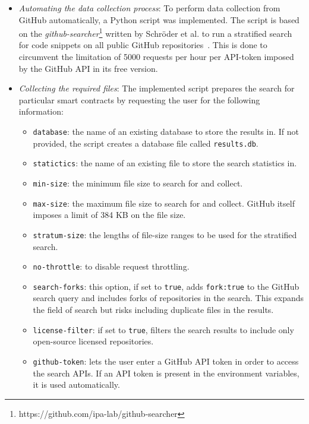 \documentclass[10pt,conference]{IEEEtran}
\begin{document}
\begin{itemize}
		\item \textit{Automating the data collection process}: To perform data collection from GitHub automatically, a Python script was implemented. The script is based on the \textit{github-searcher}\footnote{https://github.com/ipa-lab/github-searcher} written by Schröder et al. to run a stratified search for code snippets on all public GitHub repositories~\cite{schroder}. This is done to circumvent the limitation of 5000 requests per hour per API-token imposed by the GitHub API in its free version.
		\item \textit{Collecting the required files}: The implemented script prepares the search for particular smart contracts by requesting the user for the following information:
		\begin{itemize}
			\item \texttt{database}: the name of an existing database to store the results in. If not provided, the script creates a database file called \texttt{results.db}.
			\item \texttt{statictics}: the name of an existing file to store the search statistics in.
			\item \texttt{min-size}: the minimum file size to search for and collect.
			\item \texttt{max-size}: the maximum file size to search for and collect. GitHub itself imposes a limit of 384 KB on the file size.
			\item \texttt{stratum-size}: the lengths of file-size ranges to be used for the stratified search.
			\item \texttt{no-throttle}: to disable request throttling.
			\item \texttt{search-forks}: this option, if set to \texttt{true}, adds \texttt{fork:true} to the GitHub search query and includes forks of repositories in the search. This expands the field of search but risks including duplicate files in the results.
			\item \texttt{license-filter}: if set to \texttt{true}, filters the search results to include only open-source licensed repositories.
			\item \texttt{github-token}: lets the user enter a GitHub API token in order to access the search APIs. If an API token is present in the environment variables, it is used automatically.
		\end{itemize}
		

\end{itemize}
\end{document}
